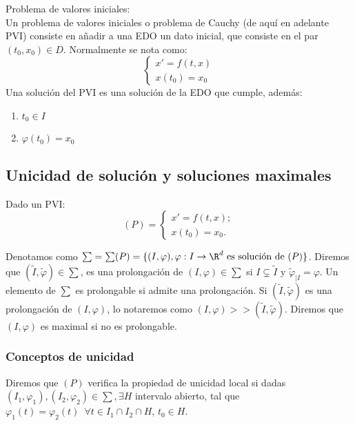 \documentclass{article}
\begin{document}
\begin{definition} Problema de valores iniciales:\\
    Un problema de valores iniciales o problema de Cauchy (de aquí en adelante PVI)
    consiste en añadir a una EDO un dato inicial, que consiste en el par $(t_0, x_0) \in D$.
    Normalmente se nota como:
    \[
    \left\{
    \begin{array}{l}
        x' = f(t,x) \\
        x(t_0) = x_0
    \end{array}
    \right.
    \]
    Una solución del PVI es una solución de la EDO que cumple, además:
    \begin{enumerate}
        \item $t_0 \in I$
        \item $\varphi(t_0) = x_0$
    \end{enumerate}
\end{definition}

\subsection{Unicidad de solución y soluciones maximales}

Dado un PVI:
\[
  (P) = \left\{
    \begin{array}{l}
      x' = f(t,x); \\
      x(t_0) = x_0.
    \end{array}
  \right.
\]

Denotamos como $\sum = \sum(P) = \{(I, \varphi), \varphi: I \to \R^d \text{ es solución de }
(P)\}$. Diremos que $(\tilde{I}, \tilde{\varphi}) \in \sum$, es una prolongación de
$(I, \varphi) \in \sum$ si $I \subsetneq \tilde{I}$ y $\tilde{\varphi}_{|I} = \varphi$.  Un elemento
de $\sum$ es prolongable si admite una prolongación. Si $(\tilde{I}, \tilde{\varphi})$ es una
prolongación de $(I, \varphi)$, lo notaremos como $(I, \varphi) >> (\tilde{I},
\tilde{\varphi})$. Diremos que $(I, \varphi)$ es maximal si no es prolongable.

\subsubsection{Conceptos de unicidad}

Diremos que $(P)$ verifica la propiedad de unicidad local si dadas
$(I_1, \varphi_1), (I_2, \varphi_2) \in \sum, \exists H$ intervalo abierto, tal que $\varphi_1(t) =
\varphi_2(t)\,\,\, \forall t \in I_1 \cap I_2 \cap H$, $t_0 \in H$.
\end{document}
